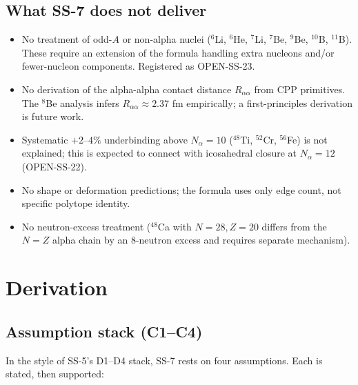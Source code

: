 \documentclass[11pt,letterpaper]{article}
\newcommand{\Nalpha}{N_{\alpha}}
\newcommand{\Raa}{R_{\alpha\alpha}}
\begin{document}
\subsection{What SS-7 does not deliver}

\begin{itemize}
\item No treatment of odd-$A$ or non-alpha nuclei (${}^6$Li, ${}^6$He, ${}^7$Li, ${}^7$Be, ${}^9$Be, ${}^{10}$B, ${}^{11}$B). These require an extension of the formula handling extra nucleons and/or fewer-nucleon components. Registered as OPEN-SS-23.
\item No derivation of the alpha-alpha contact distance $\Raa$ from CPP primitives. The ${}^8$Be analysis infers $\Raa \approx 2.37$ fm empirically; a first-principles derivation is future work.
\item Systematic $+2$--$4\%$ underbinding above $\Nalpha = 10$ (${}^{48}$Ti, ${}^{52}$Cr, ${}^{56}$Fe) is not explained; this is expected to connect with icosahedral closure at $\Nalpha = 12$ (OPEN-SS-22).
\item No shape or deformation predictions; the formula uses only edge count, not specific polytope identity.
\item No neutron-excess treatment (${}^{48}$Ca with $N = 28, Z = 20$ differs from the $N = Z$ alpha chain by an 8-neutron excess and requires separate mechanism).
\end{itemize}

\section{Derivation}
\label{sec:derivation}

\subsection{Assumption stack (C1--C4)}
\label{sec:assumptions}

In the style of SS-5's D1--D4 stack, SS-7 rests on four assumptions. Each is stated, then supported:
\end{document}
